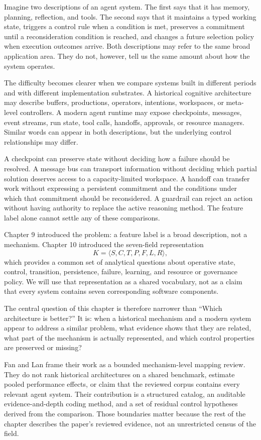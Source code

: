 Imagine two descriptions of an agent system. The first says that it has memory, planning, reflection, and tools. The second says that it maintains a typed working state, triggers a control rule when a condition is met, preserves a commitment until a reconsideration condition is reached, and changes a future selection policy when execution outcomes arrive. Both descriptions may refer to the same broad application area. They do not, however, tell us the same amount about how the system operates.

The difficulty becomes clearer when we compare systems built in different periods and with different implementation substrates. A historical cognitive architecture may describe buffers, productions, operators, intentions, workspaces, or meta-level controllers. A modern agent runtime may expose checkpoints, messages, event streams, run state, tool calls, handoffs, approvals, or resource managers. Similar words can appear in both descriptions, but the underlying control relationships may differ.

A checkpoint can preserve state without deciding how a failure should be resolved. A message bus can transport information without deciding which partial solution deserves access to a capacity-limited workspace. A handoff can transfer work without expressing a persistent commitment and the conditions under which that commitment should be reconsidered. A guardrail can reject an action without having authority to replace the active reasoning method. The feature label alone cannot settle any of these comparisons.

Chapter 9 introduced the problem: a feature label is a broad description, not a mechanism. Chapter 10 introduced the seven-field representation
\[
  K = \langle S,C,T,P,F,L,R\rangle,
\]
which provides a common set of analytical questions about operative state, control, transition, persistence, failure, learning, and resource or governance policy. We will use that representation as a shared vocabulary, not as a claim that every system contains seven corresponding software components.

The central question of this chapter is therefore narrower than ``Which architecture is better?'' It is: when a historical mechanism and a modern system appear to address a similar problem, what evidence shows that they are related, what part of the mechanism is actually represented, and which control properties are preserved or missing?

Fan and Lan frame their work as a bounded mechanism-level mapping review. They do not rank historical architectures on a shared benchmark, estimate pooled performance effects, or claim that the reviewed corpus contains every relevant agent system. Their contribution is a structured catalog, an auditable evidence-and-depth coding method, and a set of residual control hypotheses derived from the comparison. Those boundaries matter because the rest of the chapter describes the paper's reviewed evidence, not an unrestricted census of the field.

